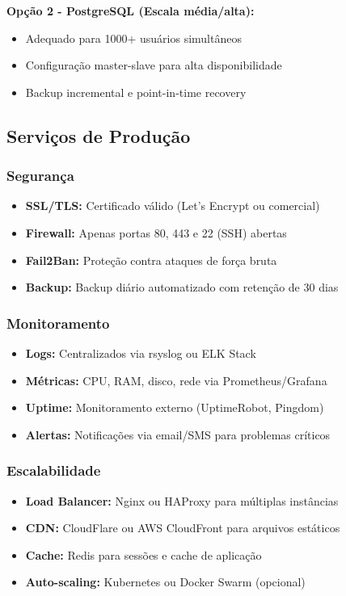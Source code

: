 \documentclass[12pt,a4paper]{article}
\begin{document}
\textbf{Opção 2 - PostgreSQL (Escala média/alta):}
\begin{itemize}
    \item Adequado para 1000+ usuários simultâneos
    \item Configuração master-slave para alta disponibilidade
    \item Backup incremental e point-in-time recovery
\end{itemize}

\subsection{Serviços de Produção}
\subsubsection{Segurança}
\begin{itemize}
    \item \textbf{SSL/TLS:} Certificado válido (Let's Encrypt ou comercial)
    \item \textbf{Firewall:} Apenas portas 80, 443 e 22 (SSH) abertas
    \item \textbf{Fail2Ban:} Proteção contra ataques de força bruta
    \item \textbf{Backup:} Backup diário automatizado com retenção de 30 dias
\end{itemize}

\subsubsection{Monitoramento}
\begin{itemize}
    \item \textbf{Logs:} Centralizados via rsyslog ou ELK Stack
    \item \textbf{Métricas:} CPU, RAM, disco, rede via Prometheus/Grafana
    \item \textbf{Uptime:} Monitoramento externo (UptimeRobot, Pingdom)
    \item \textbf{Alertas:} Notificações via email/SMS para problemas críticos
\end{itemize}

\subsubsection{Escalabilidade}
\begin{itemize}
    \item \textbf{Load Balancer:} Nginx ou HAProxy para múltiplas instâncias
    \item \textbf{CDN:} CloudFlare ou AWS CloudFront para arquivos estáticos
    \item \textbf{Cache:} Redis para sessões e cache de aplicação
    \item \textbf{Auto-scaling:} Kubernetes ou Docker Swarm (opcional)
\end{itemize}
\end{document}
